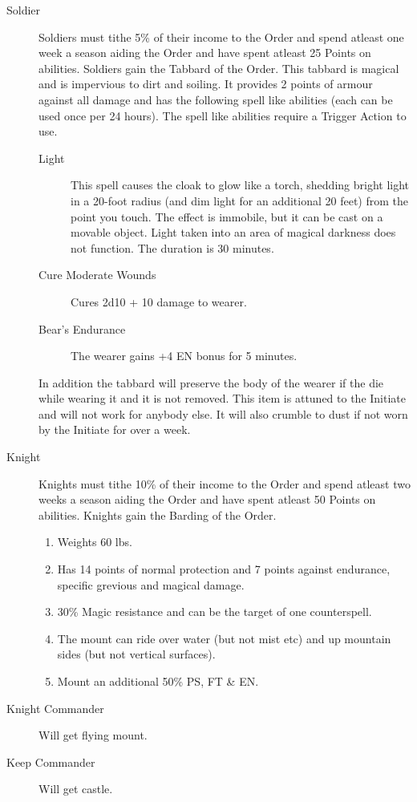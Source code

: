\documentclass[a4paper]{article}
\begin{document}
\begin{multicols*}{3}
\begin{description}
\item[Soldier] Soldiers must tithe 5\% of their income to the Order
and spend atleast one week a season aiding the Order and have spent
atleast 25 Points on abilities.  Soldiers gain the Tabbard of the
Order.  This tabbard is magical and is impervious to dirt and soiling.
It provides 2 points of armour against all damage and has the
following spell like abilities (each can be used once per 24 hours).
The spell like abilities require a Trigger Action to use.

\begin{description}
\item[Light] This spell causes the cloak to glow like a torch,
shedding bright light in a 20-foot radius (and dim light for an
additional 20 feet) from the point you touch. The effect is immobile,
but it can be cast on a movable object. Light taken into an area of
magical darkness does not function.  The duration is 30 minutes.

\item[Cure Moderate Wounds]
Cures 2d10 + 10 damage to wearer.

\item[Bear's Endurance]
The wearer gains +4 EN bonus for 5 minutes.
\end{description}

In addition the tabbard will preserve the body of the wearer if the
die while wearing it and it is not removed.  This item is attuned to
the Initiate and will not work for anybody else.  It will also crumble
to dust if not worn by the Initiate for over a week.

\item[Knight] Knights must tithe 10\% of their income to the Order and
spend atleast two weeks a season aiding the Order and have spent
atleast 50 Points on abilities.  Knights gain the Barding of the Order.
\begin{enumerate}
\item Weights 60 lbs.
\item Has 14 points of normal protection and 7 points against
endurance, specific grevious and magical damage.
\item 30\% Magic resistance and can be the target of one counterspell.
\item The mount can ride over water (but not mist etc) and up mountain
sides (but not vertical surfaces).
\item Mount an additional 50\% PS, FT \& EN.
\end{enumerate}

\item[Knight Commander]
Will get flying mount.

\item[Keep Commander]
Will get castle.

\end{description}

\end{multicols*}
\end{document}
